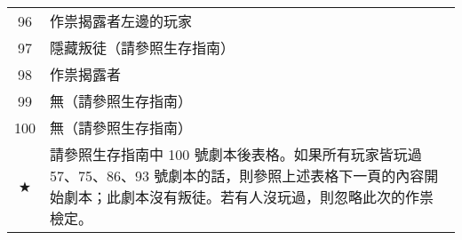 \begin{center}
\begin{minipage}[t]{.45\textwidth}
\begin{tabular}[t]{ c l }
			96             & 作祟揭露者左邊的玩家                                                                                                                          \\
			97             & 隱藏叛徒（請參照生存指南）                                                                                                                       \\
			98             & 作祟揭露者                                                                                                                               \\
			99             & 無（請參照生存指南）                                                                                                                          \\
			100            & 無（請參照生存指南）                                                                                                                          \\

			★              & \begin{minipage}[t]{15em}請參照生存指南中 100 號劇本後表格。如果所有玩家皆玩過 57、75、86、93 號劇本的話，則參照上述表格下一頁的內容開始劇本；此劇本沒有叛徒。若有人沒玩過，則忽略此次的作祟檢定。\end{minipage} \\
		\end{tabular}
	\end{minipage}
\end{center}

\twocolumn
